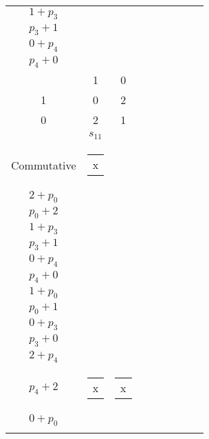 \begin{longtable}{|c|c|c|c|c|c|c|c|c|}
\begin{tabular}{@{}c@{}}
    \( p_{0} + 2 \)\\\hline
    \( 1 + p_{3} \)\\\hline
    \( p_{3} + 1 \)\\\hline
    \( 0 + p_{4} \)\\\hline
    \( p_{4} + 0 \)
\end{tabular}\\\hline
    \( \begin{smallmatrix}
    2 & 1 & 0\\
    1 & 0 & 2\\
    0 & 2 & 1\\
\end{smallmatrix} \) & \( s_{11} \) & \begin{tabular}{@{}c@{}}
    Quasigroup\\\hline
    Commutative\end{tabular} & \cellcolor{blue}\begin{tabular}{@{}c@{}}
    x
\end{tabular} & \cellcolor{yellow}\begin{tabular}{@{}c@{}}
    \\\hline
    \( 2 + p_{0} \)\\\hline
    \( p_{0} + 2 \)\\\hline
    \( 1 + p_{3} \)\\\hline
    \( p_{3} + 1 \)\\\hline
    \( 0 + p_{4} \)\\\hline
    \( p_{4} + 0 \)
\end{tabular} & \cellcolor{yellow}\begin{tabular}{@{}c@{}}
    \\\hline
    \( 1 + p_{0} \)\\\hline
    \( p_{0} + 1 \)\\\hline
    \( 0 + p_{3} \)\\\hline
    \( p_{3} + 0 \)\\\hline
    \( 2 + p_{4} \)\\\hline
    \( p_{4} + 2 \)
\end{tabular} & \cellcolor{blue}\begin{tabular}{@{}c@{}}
    x
\end{tabular} & \cellcolor{blue}\begin{tabular}{@{}c@{}}
    x
\end{tabular} & \cellcolor{yellow}\begin{tabular}{@{}c@{}}
    \\\hline
    \( 0 + p_{0} \)\\\hline

\end{tabular}
\end{longtable}
